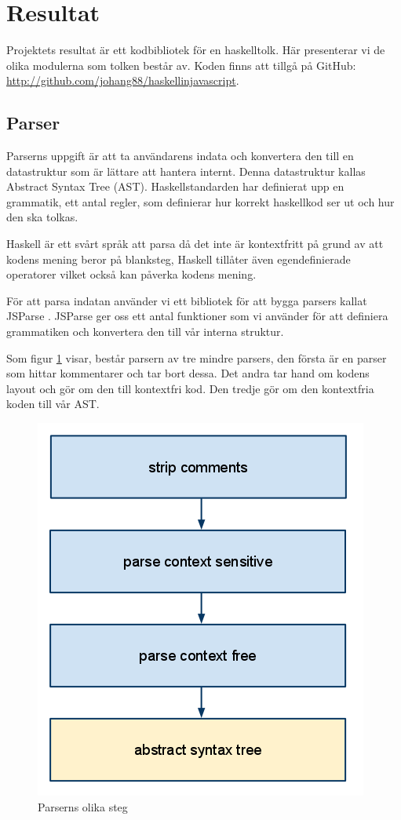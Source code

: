 \section{Resultat}

Projektets resultat är ett kodbibliotek för en haskelltolk. Här presenterar vi de olika modulerna som tolken består av. Koden finns att tillgå på GitHub: \url{http://github.com/johang88/haskellinjavascript}.

\subsection{Parser} 
Parserns uppgift är att ta användarens indata och konvertera den till en datastruktur 
som är lättare att hantera internt. Denna datastruktur kallas Abstract Syntax Tree (AST). 
Haskellstandarden har definierat upp en grammatik, ett antal regler, som definierar hur korrekt haskellkod ser ut och hur den ska tolkas.

Haskell är ett svårt språk att parsa då det inte är kontextfritt på grund av att kodens mening beror på blanksteg, 
Haskell tillåter även egendefinierade operatorer vilket också kan påverka kodens mening. 

För att parsa indatan använder vi ett bibliotek för att bygga parsers kallat JSParse \citep{jsparse}.
JSParse ger oss ett antal funktioner som vi använder för att definiera grammatiken och konvertera den till vår interna struktur.

Som figur \ref{fig:parser_steg} visar, består parsern av tre mindre parsers, den första är en parser som hittar kommentarer och tar bort dessa. 
Det andra tar hand om kodens layout och gör om den till kontextfri kod. Den tredje gör om den kontextfria koden till vår AST.

\begin{figure}[H]
    \begin{center}
        \includegraphics[width=.5\textwidth]{parser_1.png}
        \caption{Parserns olika steg}
        \label{fig:parser_steg} %
    \end{center}
\end{figure}

